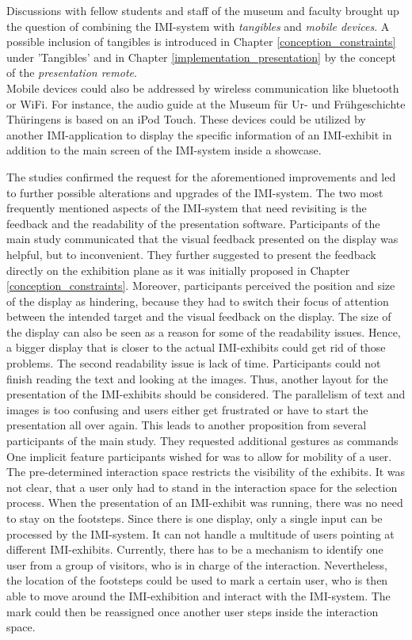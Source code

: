 Discussions with fellow students and staff of the museum and faculty brought up the question of combining the \ac{IMI}-system with \textit{tangibles} and \textit{mobile devices}. A possible inclusion of tangibles is introduced in Chapter \ref{conception_constraints} under 'Tangibles' and in Chapter \ref{implementation_presentation} by the concept of the \textit{presentation remote}.
\\
Mobile devices could also be addressed by wireless communication like bluetooth or WiFi. For instance, the audio guide at the Museum für Ur- und Frühgeschichte Thüringens is based on an iPod Touch. These devices could be utilized by another \ac{IMI}-application to display the specific information of an \ac{IMI}-exhibit in addition to the main screen of the \ac{IMI}-system inside a showcase.

The studies confirmed the request for the aforementioned improvements and led to further possible alterations and upgrades of the \ac{IMI}-system. The two most frequently mentioned aspects of the \ac{IMI}-system that need revisiting is the feedback and the readability of the presentation software. Participants of the main study communicated that the visual feedback presented on the display was helpful, but to inconvenient. They further suggested to present the feedback directly on the exhibition plane as it was initially proposed in Chapter \ref{conception_constraints}. Moreover, participants perceived the position and size of the display as hindering, because they had to switch their focus of attention between the intended target and the visual feedback on the display. The size of the display can also be seen as a reason for some of the readability issues. Hence, a bigger display that is closer to the actual \ac{IMI}-exhibits could get rid of those problems. The second readability issue is lack of time. Participants could not finish reading the text and looking at the images. Thus, another layout for the presentation of the \ac{IMI}-exhibits should be considered. The parallelism of text and images is too confusing and users either get frustrated or have to start the presentation all over again. This leads to another proposition from several participants of the main study. They requested additional gestures as commands
\\
One implicit feature participants wished for was to allow for mobility of a user. The pre-determined interaction space restricts the visibility of the exhibits. It was not clear, that a user only had to stand in the interaction space for the selection process. When the presentation of an \ac{IMI}-exhibit was running, there was no need to stay on the footsteps. Since there is one display, only a single input can be processed by the \ac{IMI}-system. It can not handle a multitude of users pointing at different \ac{IMI}-exhibits. Currently, there has to be a mechanism to identify one user from a group of visitors, who is in charge of the interaction. Nevertheless, the location of the footsteps could be used to mark a certain user, who is then able to move around the \ac{IMI}-exhibition and interact with the \ac{IMI}-system. The mark could then be reassigned once another user steps inside the interaction space.
